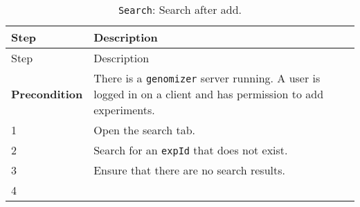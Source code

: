 \begin{longtable}[c]{@{}ll@{}}
\caption{\texttt{Search}: Search after add.}\tabularnewline
\toprule
\begin{minipage}[b]{0.31\columnwidth}\raggedright\strut
Step
\strut\end{minipage} &
\begin{minipage}[b]{0.63\columnwidth}\raggedright\strut
Description
\strut\end{minipage}\tabularnewline
\midrule
\endfirsthead
\toprule
\begin{minipage}[b]{0.31\columnwidth}\raggedright\strut
Step
\strut\end{minipage} &
\begin{minipage}[b]{0.63\columnwidth}\raggedright\strut
Description
\strut\end{minipage}\tabularnewline
\midrule
\endhead
\begin{minipage}[t]{0.31\columnwidth}\raggedright\strut
\textbf{Precondition}
\strut\end{minipage} &
\begin{minipage}[t]{0.63\columnwidth}\raggedright\strut
There is a \texttt{genomizer} server running. A user is logged in on a
client and has permission to add experiments.
\strut\end{minipage}\tabularnewline
\begin{minipage}[t]{0.31\columnwidth}\raggedright\strut
1
\strut\end{minipage} &
\begin{minipage}[t]{0.63\columnwidth}\raggedright\strut
Open the search tab.
\strut\end{minipage}\tabularnewline
\begin{minipage}[t]{0.31\columnwidth}\raggedright\strut
2
\strut\end{minipage} &
\begin{minipage}[t]{0.63\columnwidth}\raggedright\strut
Search for an \texttt{expId} that does not exist.
\strut\end{minipage}\tabularnewline
\begin{minipage}[t]{0.31\columnwidth}\raggedright\strut
3
\strut\end{minipage} &
\begin{minipage}[t]{0.63\columnwidth}\raggedright\strut
Ensure that there are no search results.
\strut\end{minipage}\tabularnewline
\begin{minipage}[t]{0.31\columnwidth}\raggedright\strut
4
\strut\end{minipage} &

\end{longtable}
